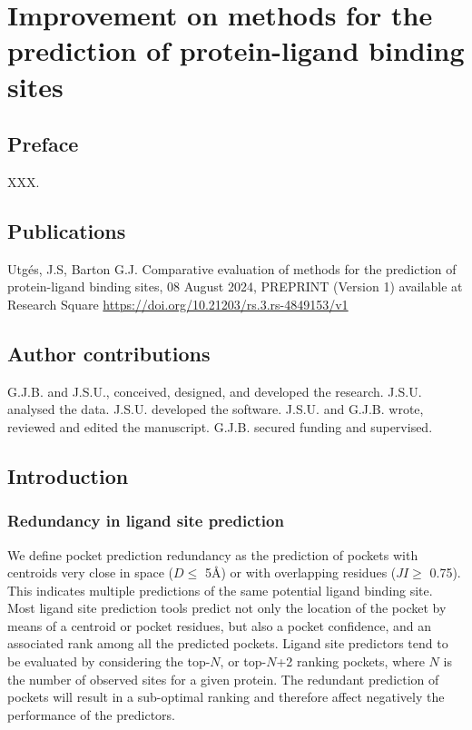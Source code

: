 \chapter{Improvement on methods for the prediction of protein-ligand binding sites}

\section*{Preface}

XXX.

\section*{Publications}

Utgés, J.S, Barton G.J. Comparative evaluation of methods for the prediction of protein-ligand binding sites, 08 August 2024, PREPRINT (Version 1) available at Research Square \url{https://doi.org/10.21203/rs.3.rs-4849153/v1}

\section*{Author contributions}

G.J.B. and J.S.U., conceived, designed, and developed the research. J.S.U. analysed the data. J.S.U. developed the software. J.S.U. and G.J.B. wrote, reviewed and edited the manuscript. G.J.B. secured funding and supervised.

\section{Introduction}

\subsection{Redundancy in ligand site prediction}

We define pocket prediction redundancy as the prediction of pockets with centroids very close in space ($D \leq$ 5\AA{}) or with overlapping residues ($JI \geq$ 0.75). This indicates multiple predictions of the same potential ligand binding site. Most ligand site prediction tools predict not only the location of the pocket by means of a centroid or pocket residues, but also a pocket confidence, and an associated rank among all the predicted pockets. Ligand site predictors tend to be evaluated by considering the top-$N$, or top-$N$+2 ranking pockets, where $N$ is the number of observed sites for a given protein. The redundant prediction of pockets will result in a sub-optimal ranking and therefore affect negatively the performance of the predictors.

